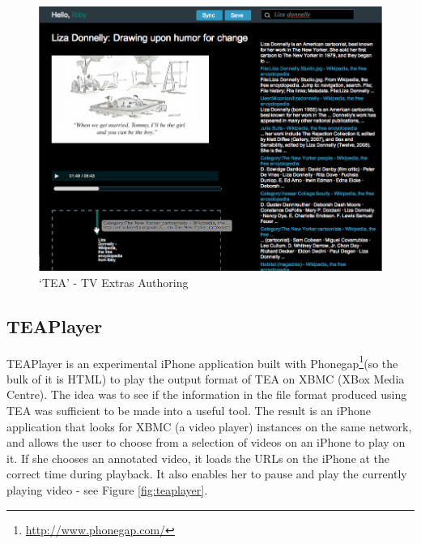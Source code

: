 \documentclass{notube}
\begin{document}
\begin{figure}[htbp]
\begin{center}
\includegraphics[width=6in]{images/tea.png}
\caption{`TEA' - TV Extras Authoring} \label{fig:tea}
\end{center}
\end{figure} 


\subsection{TEAPlayer}

TEAPlayer is an experimental iPhone application built with Phonegap\footnote{\url{http://www.phonegap.com/}}(so the bulk of it is HTML) to play the output format of TEA on XBMC (XBox Media Centre). The idea was to see if the information in the file format produced using TEA was sufficient to be made into a useful tool. The result is an iPhone application that looks for XBMC (a video player) instances on the same network, and allows the user to choose from a selection of videos on an iPhone to play on it. If she chooses an annotated video, it loads the URLs on the iPhone at the correct time during playback. It also enables her to pause and play the currently playing video - see Figure \ref{fig:teaplayer}.
\end{document}
